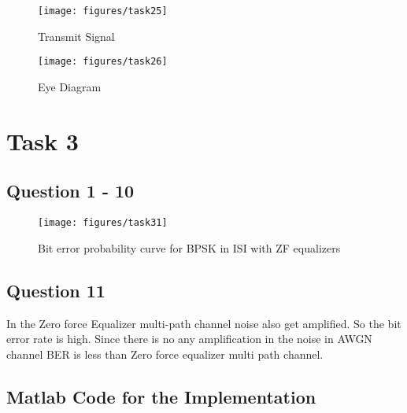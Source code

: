 \documentclass[a4paper,11pt]{article}%
\begin{document}
\begin{figure}[H]
	\centering
	\texttt{[image: figures/task25]}
	\caption{Transmit Signal}
\end{figure}

\begin{figure}[H]
	\centering
	\texttt{[image: figures/task26]}
	\caption{Eye Diagram}
\end{figure}


\section{Task 3}
\subsection{Question 1 - 10}
\begin{figure}[H]
	\centering
	\texttt{[image: figures/task31]}
	\caption{Bit error probability curve for BPSK in ISI with ZF equalizers}
\end{figure}

\subsection{Question 11}
In the Zero force Equalizer multi-path channel noise also get amplified. So the bit error rate is high. Since there is no any amplification in the noise in AWGN channel BER is less than Zero force equalizer multi path channel.


\begin{appendices}
	\section{Matlab Code for the Implementation}
	
\end{appendices}

\end{document}
